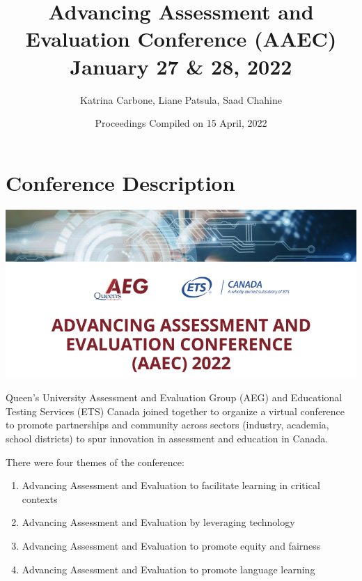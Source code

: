 \documentclass[
]{book}
\title{Advancing Assessment and Evaluation Conference (AAEC) January 27 \& 28, 2022}
\author{Katrina Carbone, Liane Patsula, Saad Chahine}
\date{Proceedings Compiled on 15 April, 2022}
\providecommand{\tightlist}{%
  \setlength{\itemsep}{0pt}\setlength{\parskip}{0pt}}
\begin{document}
\maketitle

{
\setcounter{tocdepth}{1}
\tableofcontents
}
\pagestyle{fancy}
\renewcommand{\chaptermark}[1]{\markboth{\MakeUppercase{#1}}{}}
\renewcommand{\sectionmark}[1]{\markright{\MakeUppercase{#1}}{}}
\fancyhead[LE,RO]{\nouppercase{\truncate{0.5\headwidth}{\rightmark}}}
\fancyhead[LO,RE]{\nouppercase{\truncate{0.5\headwidth}{\leftmark}}}
\renewcommand{\headrulewidth}{0pt}

\hypertarget{conference-description}{%
\chapter*{Conference Description}\label{conference-description}}

\includegraphics{Content/H.png}

Queen's University Assessment and Evaluation Group (AEG) and Educational Testing Services (ETS) Canada joined together to organize a virtual conference to promote partnerships and community across sectors (industry, academia, school districts) to spur innovation in assessment and education in Canada.

There were four themes of the conference:

\begin{enumerate}
\def\labelenumi{\arabic{enumi}.}
\tightlist
\item
  Advancing Assessment and Evaluation to facilitate learning in critical contexts
\item
  Advancing Assessment and Evaluation by leveraging technology
\item
  Advancing Assessment and Evaluation to promote equity and fairness
\item
  Advancing Assessment and Evaluation to promote language learning
\end{enumerate}
\end{document}
